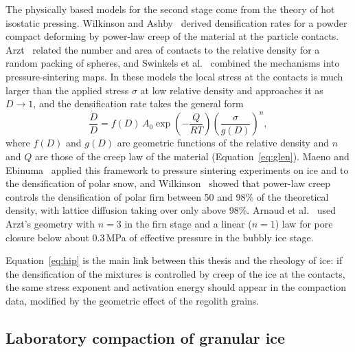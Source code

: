 The physically based models for the second stage come from the theory of hot isostatic pressing. Wilkinson and Ashby~\cite{wilkinson1975} derived densification rates for a powder compact deforming by power-law creep of the material at the particle contacts. Arzt~\cite{arzt1982} related the number and area of contacts to the relative density for a random packing of spheres, and Swinkels et al.~\cite{swinkels1983} combined the mechanisms into pressure-sintering maps. In these models the local stress at the contacts is much larger than the applied stress $\sigma$ at low relative density and approaches it as $D\to1$, and the densification rate takes the general form
\begin{equation}
    \frac{\dot D}{D} = f(D)\,A_0\exp\left(-\frac{Q}{RT}\right)\left(\frac{\sigma}{g(D)}\right)^n,
    \label{eq:hip}
\end{equation}
where $f(D)$ and $g(D)$ are geometric functions of the relative density and $n$ and $Q$ are those of the creep law of the material (Equation~\eqref{eq:glen}). Maeno and Ebinuma~\cite{maeno1983} applied this framework to pressure sintering experiments on ice and to the densification of polar snow, and Wilkinson~\cite{wilkinson1988} showed that power-law creep controls the densification of polar firn between 50 and 98\% of the theoretical density, with lattice diffusion taking over only above 98\%. Arnaud et al.~\cite{arnaud2000} used Arzt's geometry with $n = 3$ in the firn stage and a linear ($n = 1$) law for pore closure below about 0.3\,MPa of effective pressure in the bubbly ice stage.

Equation~\eqref{eq:hip} is the main link between this thesis and the rheology of ice: if the densification of the mixtures is controlled by creep of the ice at the contacts, the same stress exponent and activation energy should appear in the compaction data, modified by the geometric effect of the regolith grains.

\subsection{Laboratory compaction of granular ice}

